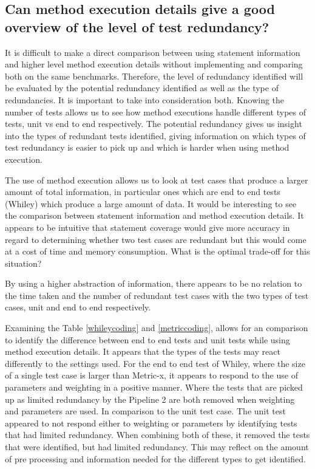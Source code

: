\subsection{Can method execution details give a good overview of the level of test redundancy?}

It is difficult to make a direct comparison between using statement information and higher level method execution details without implementing and comparing both on the same benchmarks. Therefore, the level of redundancy identified will be evaluated by the potential redundancy identified as well as the type of redundancies. It is important to take into consideration both. Knowing the number of tests allows us to see how method executions handle different types of tests, unit vs end to end respectively. The potential redundancy gives us insight into the types of redundant tests identified, giving information on which types of test redundancy is easier to pick up and which is harder when using method execution.

The use of method execution allows us to look at test cases that produce a larger amount of total information, in particular ones which are end to end tests (Whiley) which produce a large amount of data. It would be interesting to see the comparison between statement information and method execution details. It appears to be intuitive that statement coverage would give more accuracy in regard to determining whether two test cases are redundant but this would come at a cost of time and memory consumption. What is the optimal trade-off for this situation? 

By using a higher abstraction of information, there appears to be no relation to the time taken and the number of redundant test cases with the two types of test cases, unit and end to end respectively.

Examining the Table \ref{whileycoding} and \ref{metriccoding}, allows for an comparison to identify the difference between end to end tests and unit tests while using method execution details. It appears that the types of the tests may react differently to the settings used. For the end to end test of Whiley, where the size of a single test case is larger than Metric-x, it appears to respond to the use of parameters and weighting in a positive manner. Where the tests that are picked up as limited redundancy by the Pipeline 2 are both removed when weighting and parameters are used. In comparison to the unit test case. The unit test appeared to not respond either to weighting or parameters by identifying tests that had limited redundancy. When combining both of these, it removed the tests that were identified, but had limited redundancy.  This may reflect on the amount of pre processing and information needed for the different types to get identified. 


